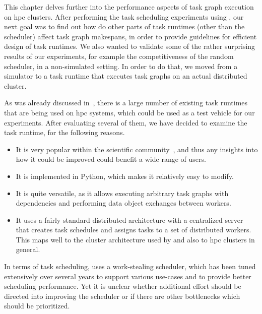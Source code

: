 This chapter delves further into the performance aspects of task graph execution on
\gls{hpc} clusters. After performing the task scheduling experiments using
\estee{}, our next goal was to find out how do other parts of task runtimes
(other than the scheduler) affect task graph makespans, in order to provide guidelines for
efficient design of task runtimes. We also wanted to validate some of the rather surprising results
of our experiments, for example the competitiveness of the random scheduler, in a non-simulated
setting. In order to do that, we moved from a simulator to a task runtime that executes task graphs
on an actual distributed cluster.

As was already discussed in~, there is a large number of existing task
runtimes that are being used on \gls{hpc} systems, which could be used as a test
vehicle for our experiments. After evaluating several of them, we have decided to examine the
\dask{}~\cite{dask} task runtime, for the following reasons.
\begin{itemize}
	\setlength\itemsep{0.1em}
	\item It is very popular within the scientific community~\cite{dask-user-survey}, and thus any insights
	      into how it could be improved could benefit a wide range of users.
	\item It is implemented in Python, which makes it relatively easy to modify.
	\item It is quite versatile, as it allows executing arbitrary task graphs with dependencies and
	      performing data object exchanges between workers.
	\item It uses a fairly standard distributed architecture with a centralized server that creates task
	      schedules and assigns tasks to a set of distributed workers. This maps well to the cluster
	      architecture used by \estee{} and also to \gls{hpc} clusters in
	      general.
\end{itemize}

In terms of task scheduling, \dask{} uses a work-stealing scheduler, which has
been tuned extensively over several years to support various use-cases and to provide better
scheduling performance. Yet it is unclear whether additional effort should be directed into
improving the scheduler or if there are other bottlenecks which should be prioritized.

